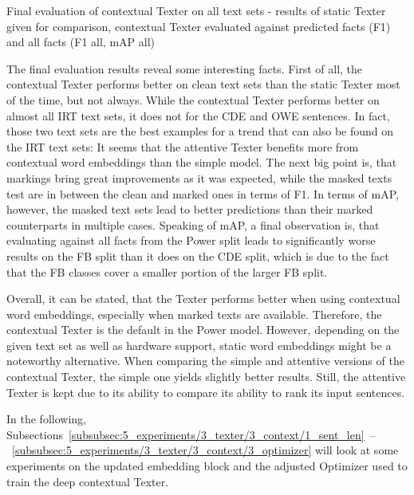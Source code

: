 \begin{table}
    \centering
    
    \caption{Final evaluation of contextual Texter on all text sets - results of static Texter given for comparison, contextual Texter evaluated against predicted facts (F1) and all facts (F1 all, mAP all)}
    \label{tab:5_experiments/3_texter/3_context/results}
\end{table}

The final evaluation results reveal some interesting facts. First of all, the contextual Texter performs better on clean text sets than the static Texter most of the time, but not always. While the contextual Texter performs better on almost all IRT text sets, it does not for the CDE and OWE sentences. In fact, those two text sets are the best examples for a trend that can also be found on the IRT text sets: It seems that the attentive Texter benefits more from contextual word embeddings than the simple model. The next big point is, that markings bring great improvements as it was expected, while the masked texts test are in between the clean and marked ones in terms of F1. In terms of mAP, however, the masked text sets lead to better predictions than their marked counterparts in multiple cases. Speaking of mAP, a final observation is, that evaluating against all facts from the Power split leads to significantly worse results on the FB split than it does on the CDE split, which is due to the fact that the FB classes cover a smaller portion of the larger FB split.

Overall, it can be stated, that the Texter performs better when using contextual word embeddings, especially when marked texts are available. Therefore, the contextual Texter is the default in the Power model. However, depending on the given text set as well as hardware support, static word embeddings might be a noteworthy alternative. When comparing the simple and attentive versions of the contextual Texter, the simple one yields slightly better results. Still, the attentive Texter is kept due to its ability to compare its ability to rank its input sentences.

In the following, Subsections~\ref{subsubsec:5_experiments/3_texter/3_context/1_sent_len}~--~\ref{subsubsec:5_experiments/3_texter/3_context/3_optimizer} will look at some experiments on the updated embedding block and the adjusted Optimizer used to train the deep contextual Texter.


